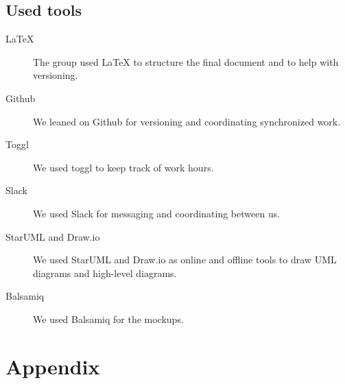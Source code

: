 \documentclass[12pt, a4paper]{article}
\begin{document}
		\subsection{Used tools}
		\begin{description}
			\item [LaTeX] The group used LaTeX to structure the final document and to help with versioning.
			\item [Github] We leaned on Github for versioning and coordinating synchronized work.
			\item [Toggl] We used toggl to keep track of work hours.
			\item [Slack] We used Slack for messaging and coordinating between us.
			\item [StarUML and Draw.io] We used StarUML and Draw.io as online and offline tools to draw UML diagrams and high-level diagrams.
			\item [Balsamiq] We used Balsamiq for the mockups.
		\end{description}

	\newpage
	\section{Appendix}
	\listoffigures
	\listoftables
\end{document}
